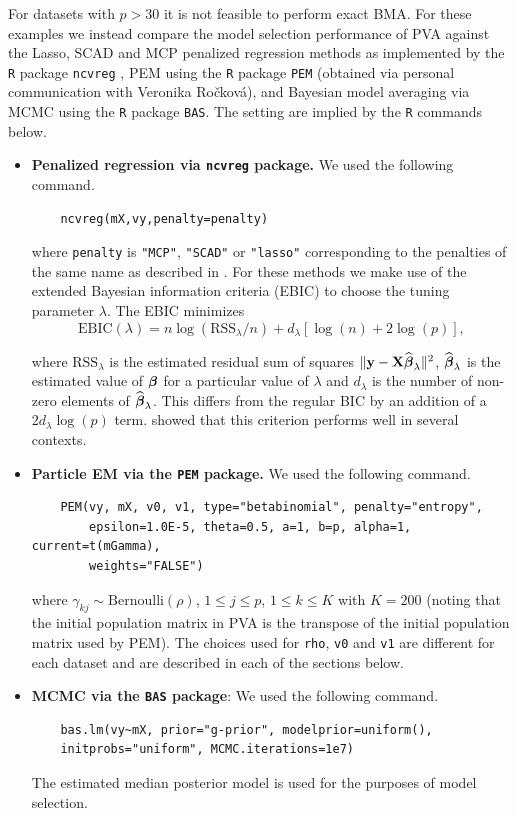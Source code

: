 For datasets with $p>30$ it is not feasible to perform exact BMA.
For these examples
we instead compare the model selection performance of PVA against the Lasso, SCAD
and MCP penalized regression methods as implemented by the {\tt R} package
{\tt ncvreg} \citep{Breheny2011}, PEM using the {\tt R} package {\tt PEM} (obtained 
via personal communication with Veronika Ro\v{c}kov\'a), and Bayesian model averaging via MCMC using
the {\tt R} package {\tt BAS}. 
The
setting are implied by the {\tt R} commands below.
\begin{itemize}
	
	
	\item {\bf Penalized regression via {\tt ncvreg} package.} We used the following command.
	\begin{verbatim}
	ncvreg(mX,vy,penalty=penalty)
	\end{verbatim}
	
	\noindent where {\tt penalty} is {\tt "MCP"}, {\tt "SCAD"} or {\tt "lasso"} corresponding to the penalties
	of the same name as described in \cite{Breheny2011}.
	For these methods we make use of the extended
	Bayesian information criteria (EBIC) \citep{Chen2008} to choose the tuning parameter $\lambda$. The EBIC 
	minimizes
	$$
	\mbox{EBIC}(\lambda) = n\log(\mbox{RSS}_\lambda/n) + d_\lambda
	\left[ \log(n) + 2\log(p) \right],
	$$
	
	\noindent where $\mbox{RSS}_\lambda$ is the estimated residual sum of squares
	$\|{\bf y} - {\bf X}\widehat{{\boldsymbol \beta}}_\lambda\|^2$, $\widehat{{\boldsymbol \beta}}_\lambda$ is the
	estimated value of ${\boldsymbol \beta}$ for a particular value of $\lambda$ and 
	$d_\lambda$ is the number of non-zero elements of $\widehat{{\boldsymbol \beta}}_\lambda$.
	This differs from the regular BIC by an addition of a $2 d_\lambda \log(p)$ term. 
	\cite{Wang2009} showed that this criterion performs well in several contexts.
	
	\item {\bf Particle EM via the {\tt PEM} package.} We used the following command.
	\begin{verbatim}
	PEM(vy, mX, v0, v1, type="betabinomial", penalty="entropy",
	    epsilon=1.0E-5, theta=0.5, a=1, b=p, alpha=1, current=t(mGamma), 
	    weights="FALSE")
	\end{verbatim}
	
	\noindent where $\gamma_{kj} \sim \mbox{Bernoulli}(\rho)$, $1\le j\le p$,
	$1\le k\le K$ with $K=200$ (noting that the initial population matrix in PVA is the transpose of the 
	initial population matrix used by PEM). The choices used for {\tt rho}, {\tt v0} and {\tt v1}
	are different for each dataset and are described in each of the sections below.
	
	
	\item {\bf MCMC via the {\tt BAS} package}: We used the following command.
	\begin{verbatim}
	bas.lm(vy~mX, prior="g-prior", modelprior=uniform(), 
    initprobs="uniform", MCMC.iterations=1e7)
	\end{verbatim}
	
	The estimated median posterior model is used for the purposes of model selection.
	
\end{itemize}

